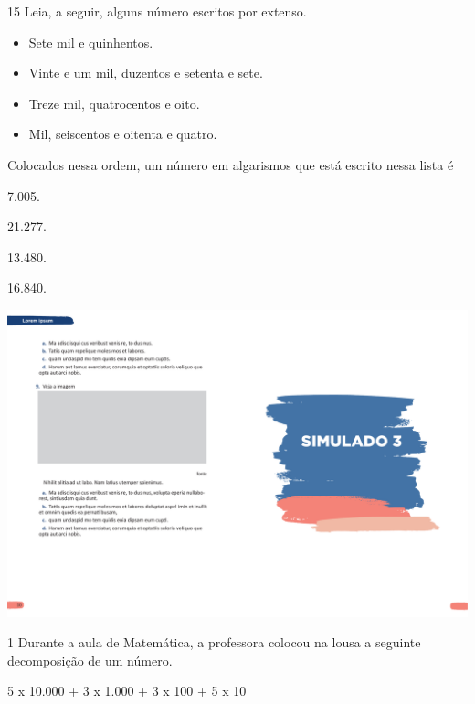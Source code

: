 \num{15} Leia, a seguir, alguns número escritos por extenso.

\begin{itemize}
\item Sete mil e quinhentos.

\item Vinte e um mil, duzentos e setenta e sete.

\item Treze mil, quatrocentos e oito.

\item Mil, seiscentos e oitenta e quatro.
\end{itemize}\enlargethispage{\baselineskip}

Colocados nessa ordem, um número em algarismos que está escrito nessa lista é

\begin{multicols}{2}
\begin{escolha}
\item 7.005.
\item 21.277.
\item 13.480.
\item 16.840.
\end{escolha}
\end{multicols}

\vspace*{-3.4cm}
\hspace*{-3.7cm}\includegraphics[scale=1]{../watermarks/3simulado5ano.pdf}

\num{1} Durante a aula de Matemática, a professora colocou na lousa a seguinte
decomposição de um número.

\begin{mdframed}[linewidth=2pt,linecolor=azul!20,backgroundcolor=azul!20,roundcorner=2pt]
5 x 10.000 + 3 x 1.000 + 3 x 100 + 5 x 10
\end{mdframed}

